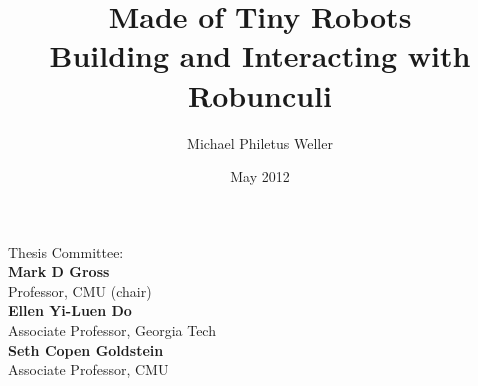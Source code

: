 \documentclass[12pt,letterpaper,notitlepage,onecolumn]{article}
\title{\textbf{Made of Tiny Robots}\\
{\large Building and Interacting with Robunculi}}
\author{Michael Philetus Weller}
\date{May 2012}
\begin{document}
\maketitle
\thispagestyle{empty}

{\centering
Thesis Committee:\\[\baselineskip]

\textbf{Mark D Gross}\\
Professor, CMU (chair)\\[\baselineskip]

\textbf{Ellen Yi-Luen Do}\\
Associate Professor, Georgia Tech\\[\baselineskip]

\textbf{Seth Copen Goldstein}\\
Associate Professor, CMU\\
}

\newpage
\abstract{%

}

\newpage
\setcounter{tocdepth}{2}
\tableofcontents
\newpage


%
%
%
%
%
%
%
%
%




%
\end{document}
